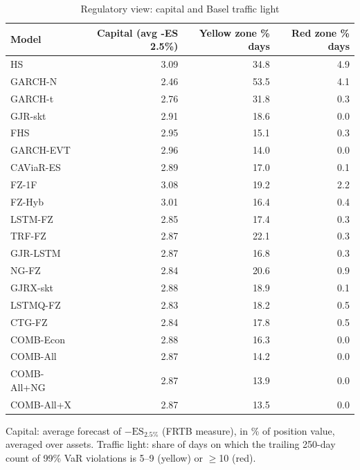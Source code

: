 \begin{table}[htbp]
\centering
\footnotesize
\caption{Regulatory view: capital and Basel traffic light}
\label{tab:reg}
\begin{tabular}{lrrr}
\toprule
Model & Capital (avg -ES 2.5\%) & Yellow zone \% days & Red zone \% days \\
\midrule
HS & 3.09 & 34.8 & 4.9 \\
GARCH-N & 2.46 & 53.5 & 4.1 \\
GARCH-t & 2.76 & 31.8 & 0.3 \\
GJR-skt & 2.91 & 18.6 & 0.0 \\
FHS & 2.95 & 15.1 & 0.3 \\
GARCH-EVT & 2.96 & 14.0 & 0.0 \\
CAViaR-ES & 2.89 & 17.0 & 0.1 \\
FZ-1F & 3.08 & 19.2 & 2.2 \\
FZ-Hyb & 3.01 & 16.4 & 0.4 \\
LSTM-FZ & 2.85 & 17.4 & 0.3 \\
TRF-FZ & 2.87 & 22.1 & 0.3 \\
GJR-LSTM & 2.87 & 16.8 & 0.3 \\
NG-FZ & 2.84 & 20.6 & 0.9 \\
GJRX-skt & 2.88 & 18.9 & 0.1 \\
LSTMQ-FZ & 2.83 & 18.2 & 0.5 \\
CTG-FZ & 2.84 & 17.8 & 0.5 \\
COMB-Econ & 2.88 & 16.3 & 0.0 \\
COMB-All & 2.87 & 14.2 & 0.0 \\
COMB-All+NG & 2.87 & 13.9 & 0.0 \\
COMB-All+X & 2.87 & 13.5 & 0.0 \\
\bottomrule
\end{tabular}
\par\smallskip\parbox{\linewidth}{\scriptsize Capital: average forecast of $-\mathrm{ES}_{2.5\%}$ (FRTB measure), in \% of position value, averaged over assets. Traffic light: share of days on which the trailing 250-day count of 99\% VaR violations is 5--9 (yellow) or $\geq$10 (red).}
\end{table}